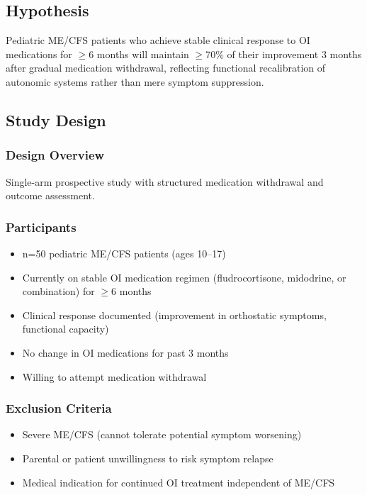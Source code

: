 \subsection{Hypothesis}

\begin{hypothesis}
Pediatric ME/CFS patients who achieve stable clinical response to OI medications for $\geq$6 months will maintain $\geq$70\% of their improvement 3 months after gradual medication withdrawal, reflecting functional recalibration of autonomic systems rather than mere symptom suppression.
\end{hypothesis}

\subsection{Study Design}

\subsubsection{Design Overview}
Single-arm prospective study with structured medication withdrawal and outcome assessment.

\subsubsection{Participants}
\begin{itemize}
    \item n=50 pediatric ME/CFS patients (ages 10--17)
    \item Currently on stable OI medication regimen (fludrocortisone, midodrine, or combination) for $\geq$6 months
    \item Clinical response documented (improvement in orthostatic symptoms, functional capacity)
    \item No change in OI medications for past 3 months
    \item Willing to attempt medication withdrawal
\end{itemize}

\subsubsection{Exclusion Criteria}
\begin{itemize}
    \item Severe ME/CFS (cannot tolerate potential symptom worsening)
    \item Parental or patient unwillingness to risk symptom relapse
    \item Medical indication for continued OI treatment independent of ME/CFS
\end{itemize}

